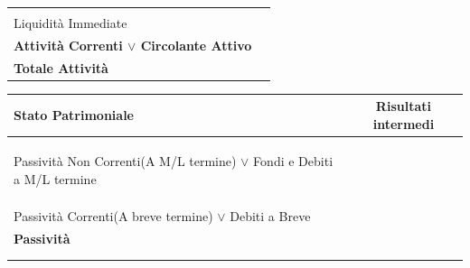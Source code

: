 \documentclass{article}
\begin{document}
\begin{table}[ht]
{\begin{tabular}{|l|c|}
            \hline
                                                                          &                     \\
            Liquidità Immediate                                           &                     \\
            \hline
            \textbf{Attività Correnti $\lor$ Circolante Attivo}           &                     \\
            \hline
            \hline
            \textbf{Totale Attività}                                      &                     \\
            \hline
        \end{tabular}
        \begin{tabular}{|l|c|}
            \hline
            \textbf{Stato Patrimoniale}                                               & Risultati intermedi \\
            \hline
                                                                                      &                     \\
                                                                                      &                     \\
                                                                                      &                     \\
            Passività Non Correnti(A M/L termine) $\lor$ Fondi e Debiti a M/L termine &                     \\
            \hline
                                                                                      &                     \\
                                                                                      &                     \\
                                                                                      &                     \\
            Passività Correnti(A breve termine) $\lor$ Debiti a Breve                 &                     \\
            \hline
            \textbf{Passività}                                                        &                     \\
            \hline
            \hline
                                                                                      &                     \\
                                                                                      &                     \\

\end{tabular}}
\end{table}
\end{document}
